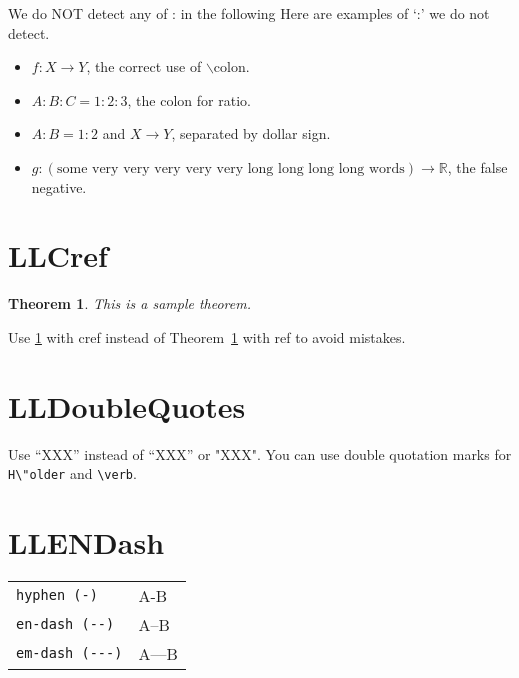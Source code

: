 \documentclass[a4paper]{article}
\newtheorem{theorem}{Theorem}
\begin{document}
\vspace{\baselineskip}

\begin{itembox}{We do NOT detect any of : in the following}
	Here are examples of `:' we do not detect.
	\begin{itemize}
		\item $f\colon X \to Y$, the correct use of $\backslash$colon.
		\item $A:B:C = 1:2:3$, the colon for ratio.
		\item $A:B = 1:2$ and $X \to Y$, separated by dollar sign.
		\item $g: (\text{some very very very very very long long long long words}) \to \mathbb{R}$, the false negative.
	\end{itemize}
\end{itembox}


\section{LLCref}

\begin{theorem}\label{thm:sample}
	This is a sample theorem.
\end{theorem}

Use \cref{thm:sample} with cref instead of Theorem~\ref{thm:sample} with ref to avoid mistakes.

\section{LLDoubleQuotes}

Use ``XXX'' instead of “XXX” or "XXX".
You can use double quotation marks for \verb|H\"older| and \verb"\verb".


\section{LLENDash}

\begin{table}[H]
	\centering
	\begin{tabular}{ll}
		\verb|hyphen (-)|    & A-B   \\
		\verb|en-dash (--)|  & A--B  \\
		\verb|em-dash (---)| & A---B
	\end{tabular}
\end{table}
\end{document}
